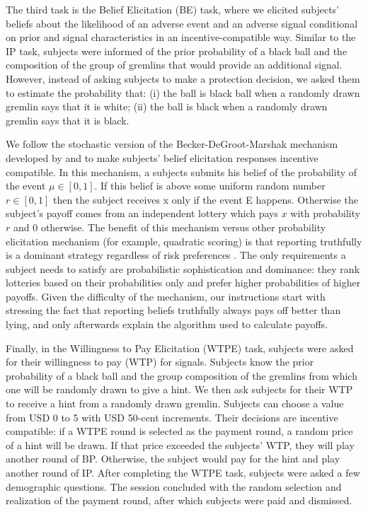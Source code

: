 \documentclass[12pt,a4paper]{article}
\begin{document}
The third task is the Belief Elicitation (BE) task, where we elicited subjects’ beliefs about the likelihood of an adverse event and an adverse signal conditional on prior and signal characteristics in an incentive-compatible way. Similar to the IP task, subjects were informed of the prior probability of a black ball and the composition of the group of gremlins that would provide an additional signal. However, instead of asking subjects to make a protection decision, we asked them to estimate the probability that: (i) the ball is black ball when a randomly drawn gremlin says that it is white; (ii) the ball is black when a randomly drawn gremlin says that it is black.   

We follow the stochastic version of the Becker-DeGroot-Marshak mechanism developed by \citet{grether_testing_1992} and \citet{holt_update_2009} to make subjects’ belief elicitation responses incentive compatible. In this mechanism, a subjects submits his belief of the probability of the event $\mu \in [0,1]$. If this belief is above some uniform random number $r\in[0,1]$ then the subject receives x only if the event E happens. Otherwise the subject's payoff comes from an independent lottery which pays $x$ with probability $r$ and 0 otherwise. The benefit of this mechanism versus other probability elicitation mechanism (for example, quadratic scoring) is that reporting truthfully is a dominant strategy regardless of risk preferences \citep{karni_mechanism_2009-1}. The only requirements a subject needs to satisfy are probabilistic sophistication and dominance: they rank lotteries based on their probabilities only and prefer higher probabilities of higher payoffs. Given the difficulty of the mechanism, our instructions start with stressing the fact that reporting beliefs truthfully always pays off better than lying, and only afterwards explain the algorithm used to calculate payoffs.

Finally, in the Willingness to Pay Elicitation (WTPE) task, subjects were asked for their willingness to pay (WTP) for signals. Subjects know the prior probability of a black ball and the group composition of the gremlins from which one will be randomly drawn to give a hint.  We then ask subjects for their WTP to receive a hint from a randomly drawn gremlin. Subjects can choose a value from USD 0 to 5 with USD 50-cent increments. Their decisions are incentive compatible: if a WTPE round is selected as the payment round, a random price of a hint will be drawn. If that price exceeded the subjects’ WTP, they will play another round of BP. Otherwise, the subject would pay for the hint and play another round of IP.  After completing the WTPE task, subjects were asked a few demographic questions. The session concluded with the random selection and realization of the payment round, after which subjects were paid and dismissed.
\end{document}
